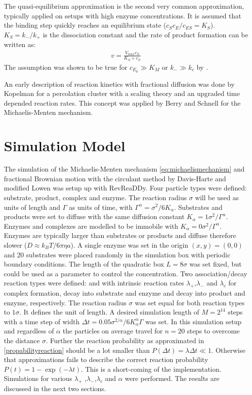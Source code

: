 \documentclass[
  a4paper,BCOR10mm,twoside,
  headsepline,footsepline,%
  fleqn,openbib
]{scrbook}
\begin{document}
The quasi-equilibrium approximation is the second very common approximation, typically applied on setups with high enzyme concentrations. It is assumed that the binding step quickly reaches an equilibrium state ($c_S c_E/c_{ES}=K_S$). $K_S=k_-/k_+$ is the dissociation constant and the rate of product formation can be written as:
\begin{align}
 v={\frac{V_{max} c_S}{K_S+ c_S}}
\end{align}
The assumption was shown to be true for $c_{E_0}\gg K_M \text{ or } k_- \gg k_c$ by \citet{Palsson1987}.\par  An early description of reaction kinetics with fractional diffusion was done by Kopelman \cite{Kopelman1988} for a percolation cluster with a scaling theory and an upgraded time depended reaction rates. This concept was applied by Berry \cite{Berry2002} and Schnell \cite{Schnell2004} for the Michaelis-Menten mechanism.
\section{Simulation Model}
The simulation of the Michaelis-Menten mechanism \cref{eq:michaelismechanism} and fractional Brownian motion with the circulant method by Davis-Harte \cite{Dieker2004} and modified Lowen was setup up with RevReaDDy. Four particle types were defined: substrate, product, complex and enzyme. The reaction radius $\sigma$ will be used as units of length and  $\Gamma$ as units of time, with $\Gamma^{\alpha}=\sigma^2/6 K_{\alpha} $.   Substrates and products were set to diffuse with the same diffusion constant $K_{\alpha}=1 \sigma^2 / \Gamma^{\alpha} $. Enzymes and complexes are modelled to be immobile with $K_{\alpha}= 0 \sigma^2 / \Gamma^{\alpha} $. Enzymes are typically larger than substrates or products and diffuse therefore slower ($D\approx k_B T/6 \pi \eta a$).  A single enzyme was set in the origin $(x,y)=(0,0)$ and 20 substrates were placed randomly in the simulation box with periodic boundary conditions. The length of the quadratic box $L=8 \sigma$ was set fixed, but could be used as a parameter to control the concentration. Two association/decay reaction types were defined:   and  with intrinsic reaction rates $\lambda_+$,$\lambda_-$ and $\lambda_c$ for complex formation, decay into substrate and enzyme and decay into product and enzyme, respectively. The reaction radius $\sigma$ was set equal for both reaction types to  $1 \sigma$. It defines the unit of length. A desired simulation length of $M=2^{14}$ steps with a time step of width $\Delta t=0.05 \sigma^{2/\alpha}/6 K_{\alpha}^{\alpha} \Gamma $ was set. In this simulation setup and regardless of $\alpha$ the particles on average travel for $n=20$ steps to overcome the distance $\sigma$. Further the reaction probability  as approximated in \cref{propabilityreaction} should be a lot smaller than  $P(\Delta t)=\lambda \Delta t \ll 1$. Otherwise that approximations fails to describe the correct reaction probability $P(t)=1-\exp(-\lambda t)$. This is a short-coming of the implementation. Simulations for various $\lambda_+$ ,$\lambda_-$,$\lambda_c$ and $\alpha$ were performed. The results are discussed in the next two sections. 
\end{document}
